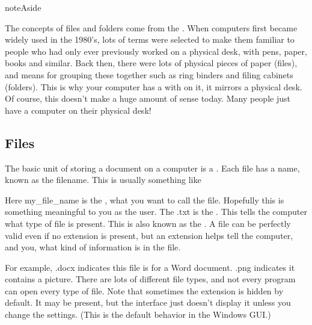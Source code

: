 \documentclass[letterpaper,10pt,british]{sphinxmanual}
\begin{document}
\begin{sphinxadmonition}{note}{Aside}

\sphinxAtStartPar
The concepts of files and folders come from the . When computers first became widely used in the 1980’s, lots of terms were selected to make them familiar to people who had only ever previously worked on a physical desk, with pens, paper, books and similar. Back then, there were lots of physical pieces of paper (files), and means for grouping these together such as ring binders and filing cabinets (folders). This is why your computer has a  with  on it, it mirrors a physical desk. Of course, this doesn’t make a huge amount of sense today. Many people just have a computer on their physical desk!
\end{sphinxadmonition}


\subsection{Files}
\label{\detokenize{chapters/computer_software/files_and_folders:files}}
\sphinxAtStartPar
The basic unit of storing a document on a computer is a . Each file has a name, known as the filename. This is usually something like

\begin{sphinxVerbatim}[commandchars=\\\{\}]
\end{sphinxVerbatim}

\sphinxAtStartPar
Here my\_file\_name is the , what you want to call the file. Hopefully this is something meaningful to you as the user. The .txt is the . This tells the computer what type of file is present. This is also known as the . A file can be perfectly valid even if no extension is present, but an extension helps tell the computer, and you, what kind of information is in the file.

\sphinxAtStartPar
For example, .docx indicates this file is for a Word document. .png indicates it contains a picture. There are lots of different file types, and not every program can open every type of file. Note that sometimes the extension is hidden by default. It may be present, but the interface just doesn’t display it unless you change the settings. (This is the default behavior in the Windows GUI.)
\end{document}
